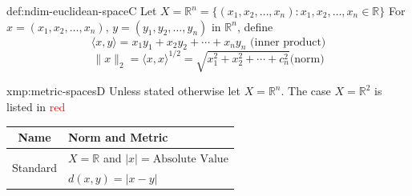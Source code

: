 \documentclass[landscape, 8pt]{extarticle}
\begin{document}
\begin{multicols}{3}
\vspace{-5pt}

\begin{dfn}{def:ndim-euclidean-space}{C}
    \vspace{-5pt}
    Let $X = \mathbb{R}^{n} = \{(x_{1},x_{2},\dots,x_{n}) : x_{1},x_{2},\dots,x_{n}\in\mathbb{R}\}$
    \newline
    For $x = (x_{1},x_{2},\dots,x_{n})$, $y=(y_{1},y_{2},\dots,y_{n})$ in $\mathbb{R}^{n}$, define
    \[\langle x,y \rangle = x_{1}y_{1} + x_{2}y_{2} + \cdots + x_{n}y_{n} \text{ (inner product)}\]
    \[\lVert x \rVert_{2} = \langle x,x \rangle^{1/2} = \sqrt{x^{2}_{1} + x^{2}_{2} + \cdots + c^{2}_{n}}\text{(norm)}\]
\end{dfn}
\vspace{-5pt}

\begin{xmp}{xmp:metric-spaces}{D}
    \vspace{-5pt}
    Unless stated otherwise let $X = \mathbb{R}^{n}$. The case $X = \mathbb{R}^{2}$ is listed in \textcolor{red}{red}

    \vspace{-6pt}
    \def\arraystretch{1.5}
    \begin{center}
        \begin{tabular}{|c|l|}
        \hline
        \textbf{Name} & \textbf{Norm and Metric} \\
        \hline
        \multirow{2}{*}{Standard} & $X = \mathbb{R}$ and $\lvert x \rvert = \text{Absolute Value}$ \\
        & $d(x, y) = \lvert x - y \rvert$ \\


\end{tabular}
\end{center}
\end{xmp}
\end{multicols}
\end{document}

